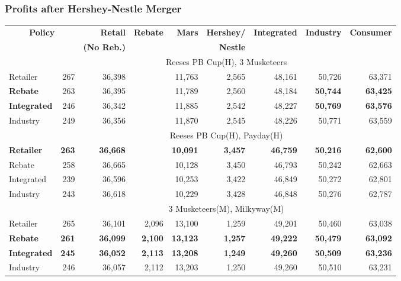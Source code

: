 \begin{frame}
\frametitle{Profits after Hershey-Nestle Merger}
\tiny
\begin{table}[htbp]
  \centering
\begin{tabular}{l | rrrrrrrr}
        \hline
\multicolumn{2}{c}{\textbf{Policy}} & \textbf{Retail} & \textbf{Rebate} & \textbf{Mars} & \textbf{Hershey/} & \textbf{Integrated} & \textbf{Industry} & \textbf{Consumer} \\
\multicolumn{2}{c}{\textbf{ }}  & \textbf{(No Reb.)} && &\textbf{Nestle}& & & \\
            \hline
      & \multicolumn{8}{c}{Reeses PB Cup(H), 3 Musketeers}      \\
            \hline
Retailer & 267   & 36,398 &       & 11,763 & 2,565 & 48,161 & 50,726 & 63,371 \\
\textbf{Rebate} & 263   & 36,395 &       & 11,789 & 2,560 & 48,184 & \textbf{50,744} & \textbf{63,425} \\
\textbf{Integrated} & 246   & 36,342 &       & 11,885 & 2,542 & 48,227 & \textbf{50,769} & \textbf{63,576} \\
Industry & 249   & 36,356 &       & 11,870 & 2,545 & 48,226 & 50,771 & 63,559 \\
      \hline
      & \multicolumn{8}{c}{Reeses PB Cup(H), Payday(H)}        \\
      \hline
\textbf{Retailer} & \textbf{263} & \textbf{36,668} & \textbf{} & \textbf{10,091} & \textbf{3,457} & \textbf{46,759} & \textbf{50,216} & \textbf{62,600} \\
Rebate & 258   & 36,665 &       & 10,128 & 3,450 & 46,793 & 50,242 & 62,663 \\
Integrated & 239   & 36,596 &       & 10,253 & 3,422 & 46,849 & 50,272 & 62,801 \\
Industry & 243   & 36,618 &       & 10,229 & 3,428 & 46,848 & 50,276 & 62,787 \\
\hline
      & \multicolumn{8}{c}{3 Musketeers(M), Milkyway(M)}             \\
      \hline
Retailer & 265   & 36,101 & 2,096 & 13,100 & 1,259 & 49,201 & 50,460 & 63,038 \\
\textbf{Rebate} & \textbf{261} & \textbf{36,099} & \textbf{2,100} & \textbf{13,123} & \textbf{1,257} & \textbf{49,222} & \textbf{50,479} & \textbf{63,092} \\
\textbf{Integrated} & \textbf{245} & \textbf{36,052} & \textbf{2,113} & \textbf{13,208} & \textbf{1,249} & \textbf{49,260} & \textbf{50,509} & \textbf{63,236} \\
Industry & 246   & 36,057 & 2,112 & 13,203 & 1,250 & 49,260 & 50,510 & 63,231 \\
\end{tabular}
  \label{hnmerger}%
\end{table}

\end{frame}

